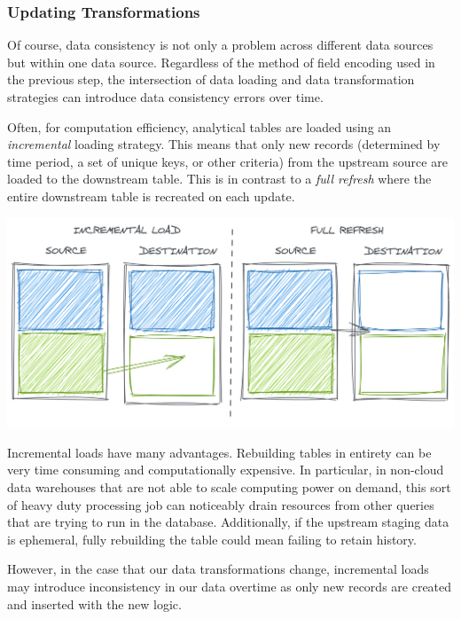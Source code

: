 \documentclass[
]{krantz}
\begin{document}
\hypertarget{updating-transformations}{%
\subsubsection{Updating Transformations}\label{updating-transformations}}

Of course, data consistency is not only a problem across different data sources but within one data source. Regardless of the method of field encoding used in the previous step, the intersection of data loading and data transformation strategies can introduce data consistency errors over time.

Often, for computation efficiency, analytical tables are loaded using an \emph{incremental} loading strategy. This means that only new records (determined by time period, a set of unique keys, or other criteria) from the upstream source are loaded to the downstream table. This is in contrast to a \emph{full refresh} where the entire downstream table is recreated on each update.

\begin{center}\includegraphics[width=0.9\linewidth]{figures/data-dall/incr-full-good} \end{center}

Incremental loads have many advantages. Rebuilding tables in entirety can be very time consuming and computationally expensive. In particular, in non-cloud data warehouses that are not able to scale computing power on demand, this sort of heavy duty processing job can noticeably drain resources from other queries that are trying to run in the database. Additionally, if the upstream staging data is ephemeral, fully rebuilding the table could mean failing to retain history.

However, in the case that our data transformations change, incremental loads may introduce inconsistency in our data overtime as only new records are created and inserted with the new logic.
\end{document}
